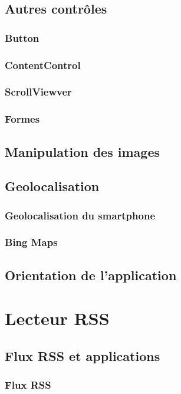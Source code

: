 \documentclass[twoside,UTF8]{EPURapport}
\begin{document}
	\section{Autres contrôles}
		\subsection{Button}
		\subsection{ContentControl}
		\subsection{ScrollViewver}
		\subsection{Formes}
		
	\section{Manipulation des images}
	
	\section{Geolocalisation}
		\subsection{Geolocalisation du smartphone}
		
		\subsection{Bing Maps}
	\section{Orientation de l'application}
		

\chapter{Lecteur RSS}
	\section{Flux RSS et applications}
		\subsection{Flux RSS}
		
\end{document}
